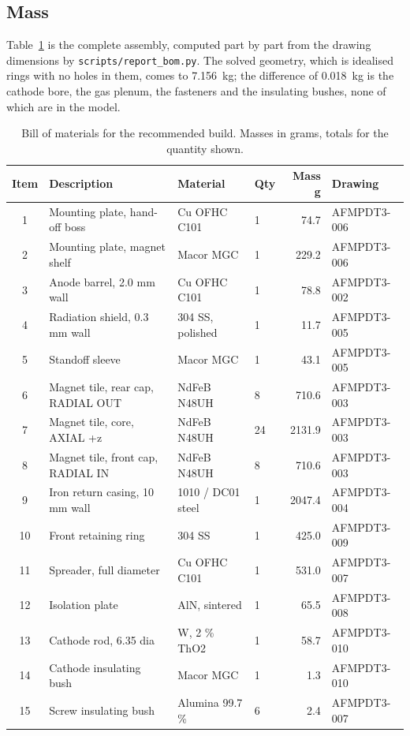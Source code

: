 \documentclass[11pt,a4paper]{article}
\begin{document}
\subsection{Mass}
Table~\ref{tab:bom} is the complete assembly, computed part by part from the
drawing dimensions by \texttt{scripts/report\_bom.py}. The solved geometry, which
is idealised rings with no holes in them, comes to 7.156~kg; the difference of
0.018~kg is the cathode bore, the gas plenum, the fasteners and the insulating
bushes, none of which are in the model.

\begin{table}[H]
\centering
\caption{Bill of materials for the recommended build. Masses in grams, totals
for the quantity shown.}
\label{tab:bom}
\small
\begin{tabular}{clllrl}
\toprule
\textbf{Item} & \textbf{Description} & \textbf{Material} & \textbf{Qty} &
\textbf{Mass g} & \textbf{Drawing} \\
\midrule
1 & Mounting plate, hand-off boss & Cu OFHC C101 & 1 & 74.7 & AFMPDT3-006 \\
2 & Mounting plate, magnet shelf & Macor MGC & 1 & 229.2 & AFMPDT3-006 \\
3 & Anode barrel, 2.0 mm wall & Cu OFHC C101 & 1 & 78.8 & AFMPDT3-002 \\
4 & Radiation shield, 0.3 mm wall & 304 SS, polished & 1 & 11.7 & AFMPDT3-005 \\
5 & Standoff sleeve & Macor MGC & 1 & 43.1 & AFMPDT3-005 \\
6 & Magnet tile, rear cap, RADIAL OUT & NdFeB N48UH & 8 & 710.6 & AFMPDT3-003 \\
7 & Magnet tile, core, AXIAL +z & NdFeB N48UH & 24 & 2131.9 & AFMPDT3-003 \\
8 & Magnet tile, front cap, RADIAL IN & NdFeB N48UH & 8 & 710.6 & AFMPDT3-003 \\
9 & Iron return casing, 10 mm wall & 1010 / DC01 steel & 1 & 2047.4 & AFMPDT3-004 \\
10 & Front retaining ring & 304 SS & 1 & 425.0 & AFMPDT3-009 \\
11 & Spreader, full diameter & Cu OFHC C101 & 1 & 531.0 & AFMPDT3-007 \\
12 & Isolation plate & AlN, sintered & 1 & 65.5 & AFMPDT3-008 \\
13 & Cathode rod, 6.35 dia & W, 2 \% ThO2 & 1 & 58.7 & AFMPDT3-010 \\
14 & Cathode insulating bush & Macor MGC & 1 & 1.3 & AFMPDT3-010 \\
15 & Screw insulating bush & Alumina 99.7 \% & 6 & 2.4 & AFMPDT3-007 \\

\end{tabular}
\end{table}
\end{document}
